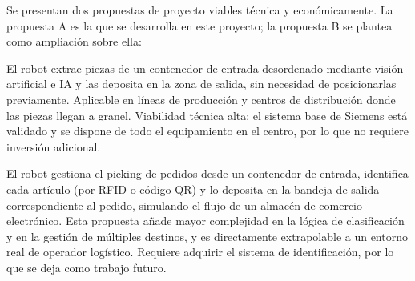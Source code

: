 Se presentan dos propuestas de proyecto viables técnica y económicamente. La propuesta A es la que se desarrolla en este proyecto; la propuesta B se plantea como ampliación sobre ella:

El robot extrae piezas de un contenedor de entrada desordenado
mediante visión artificial e IA y las deposita en la zona de salida, sin necesidad de posicionarlas previamente. Aplicable en
líneas de producción y centros de distribución donde las piezas llegan a granel. Viabilidad técnica alta: el sistema base de
Siemens está validado y se dispone de todo el equipamiento en el centro, por lo que no requiere inversión adicional.


El robot gestiona el picking de pedidos desde un contenedor de entrada,
identifica cada artículo (por RFID o código QR) y lo deposita en la bandeja de salida correspondiente al pedido, simulando el flujo
de un almacén de comercio electrónico. Esta propuesta añade mayor complejidad en la lógica de clasificación y en la gestión
de múltiples destinos, y es directamente extrapolable a un entorno real de operador logístico. Requiere adquirir el
sistema de identificación, por lo que se deja como trabajo futuro.
